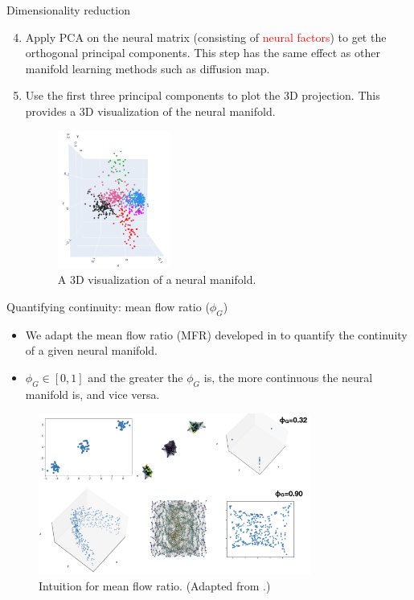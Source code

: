 \documentclass[xcolor={dvipsnames,svgnames}]{beamer}
\begin{document}
\begin{frame}{Dimensionality reduction}
\begin{enumerate}\setcounter{enumi}{3}
    \item Apply PCA on the neural matrix (consisting of \textcolor{red}{neural factors}) to get the orthogonal principal components. This step has the same effect as other manifold learning methods such as diffusion map. 
    \item Use the first three principal components to plot the 3D projection. This provides a 3D visualization of the neural manifold. 
    \begin{figure}
    \includegraphics[width=0.35\textwidth]{figures/biological/retina-manifold.png}
     \caption{A 3D visualization of a neural manifold.}
\end{figure} 
\end{enumerate}
\end{frame}

\begin{frame}{Quantifying continuity: mean flow ratio ($\phi_G$)}
\begin{itemize}
    \item We adapt the mean flow ratio (MFR) developed in \cite{dyballa_manifold_2021} to quantify the continuity of a given neural manifold.
    \item $\phi_G \in [0,1]$ and the greater the $\phi_G$ is, the more continuous the neural manifold is, and vice versa.
\end{itemize}
  \begin{figure}[H]
        \centering
         \includegraphics[width=0.8\textwidth]{presentation/embeddings/mean-flow-ratio.PNG}
            \caption{Intuition for mean flow ratio. (Adapted from \cite{dyballa_manifold_2021}.)}
        \end{figure} 
\end{frame}
\end{document}
